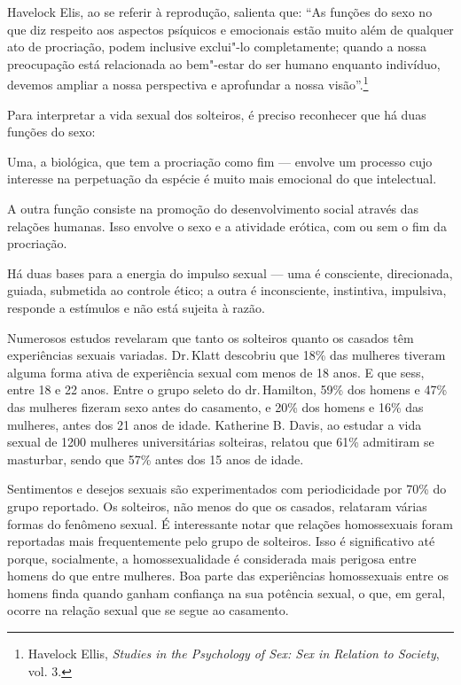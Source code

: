 Havelock Elis, ao se referir à reprodução, salienta que: ``As funções do
sexo no que diz respeito aos aspectos psíquicos e emocionais estão muito
além de qualquer ato de procriação, podem inclusive exclui"-lo
completamente; quando a nossa preocupação está relacionada ao
bem"-estar do ser humano enquanto indivíduo, devemos ampliar a nossa
perspectiva e aprofundar a nossa visão''.\footnote{Havelock Ellis,
  \emph{Studies in the Psychology of Sex: Sex in Relation to Society},
  vol. 3.}

Para interpretar a vida sexual dos solteiros, é preciso reconhecer que
há duas funções do sexo:

Uma, a biológica, que tem a procriação como fim --- envolve um processo cujo
interesse na perpetuação da espécie é muito mais emocional do que
intelectual.

A outra função consiste na promoção do desenvolvimento social através
das relações humanas. Isso envolve o sexo e a atividade erótica, com ou
sem o fim da procriação.

Há duas bases para a energia do impulso sexual --- uma é consciente,
direcionada, guiada, submetida ao controle ético; a outra é
inconsciente, instintiva, impulsiva, responde a estímulos e não está
sujeita à razão.


Numerosos estudos revelaram que tanto os solteiros quanto os casados
têm experiências sexuais variadas. Dr.\,Klatt descobriu que 18\% das
mulheres tiveram alguma forma ativa de experiência sexual com menos de
18 anos. E que sess, %
entre 18 e 22 anos. Entre o grupo seleto do dr.\,Hamilton, 59\% dos homens e 47\% das mulheres fizeram sexo antes do
casamento, e 20\% dos homens e 16\% das mulheres, antes dos 21 anos de
idade. Katherine B. Davis, ao estudar a vida sexual de 1200 mulheres
universitárias solteiras, relatou que 61\% admitiram se masturbar, sendo
que 57\% antes dos 15 anos de idade.

Sentimentos e desejos sexuais são experimentados com periodicidade por
70\% do grupo reportado. Os solteiros, não menos do que os
casados, relataram várias formas do fenômeno sexual. É interessante
notar que relações homossexuais foram reportadas mais frequentemente
pelo grupo de solteiros. Isso é significativo até porque, socialmente, a
homossexualidade é considerada mais perigosa entre homens do que entre
mulheres. Boa parte das experiências homossexuais entre os homens finda
quando ganham confiança na sua potência sexual, o que, em geral, ocorre na relação sexual que se segue ao casamento.


